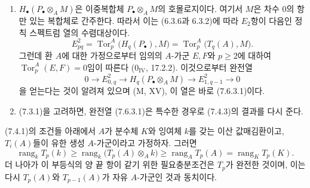 \begin{remarks}[7.6.4]
\label{III.7.6.4-fr}
\begin{enumerate}
  \item[(i)] $H_\bullet(P_\bullet\otimes_A M)$은 이중복합체
    $P_\bullet\otimes_A M$의 호몰로지이다. 여기서 $M$은 차수 0의 항만
    있는 복합체로 간주한다. 따라서 이는 (6.3.6과 6.3.2)에 따라 $E_2$항이
    다음인 정칙 스펙트럼 열의 수렴대상이다.
    \[
      E^2_{pq}
      =
      \operatorname{Tor}_p^A\bigl(H_q(P_\bullet),M\bigr)
      =
      \operatorname{Tor}_p^A\bigl(T_q(A),M\bigr).
    \]
    그런데 환 $A$에 대한 가정으로부터 임의의 $A$-가군 $E,F$와
    $p\geq2$에 대하여
    $\operatorname{Tor}_p^A(E,F)=0$임이 따른다
    ($0_{\mathrm{IV}}$, 17.2.2). 이것으로부터 완전열
    \[
      0\longrightarrow E^2_{0,q}
      \longrightarrow H_q(P_\bullet\otimes_A M)
      \longrightarrow E^2_{1,q-1}
      \longrightarrow0
    \]
    을 얻는다는 것이 알려져 있으며 (M, XV), 이 열은 바로 (7.6.3.1)이다.
  \item[(ii)] (7.3.1)을 고려하면, 완전열 (7.6.3.1)은 특수한 경우로
    (7.4.3)의 결과를 다시 준다.
\end{enumerate}
\end{remarks}

\begin{corollary}[7.6.5]
\label{III.7.6.5-fr}
(7.4.1)의 조건들 아래에서 $A$가 분수체 $K$와 잉여체 $k$를 갖는 이산
값매김환이고, $T_i(A)$들이 유한 생성 $A$-가군이라고 가정하자. 그러면
\[
  \operatorname{rang}_k T_p(k)
  \geq
  \operatorname{rang}_k\bigl(T_p(A)\otimes_A k\bigr)
  \geq
  \operatorname{rang}_A T_p(A)
  =
  \operatorname{rang}_K T_p(K).
  \tag{7.6.5.1}\label{III.7.6.5.1.fr}
\]
더 나아가 이 부등식의 양 끝 항이 같기 위한 필요충분조건은 $T_p$가
완전한 것이며, 이는 다시 $T_p(A)$와 $T_{p-1}(A)$가 자유
$A$-가군인 것과 동치이다.
\end{corollary}

